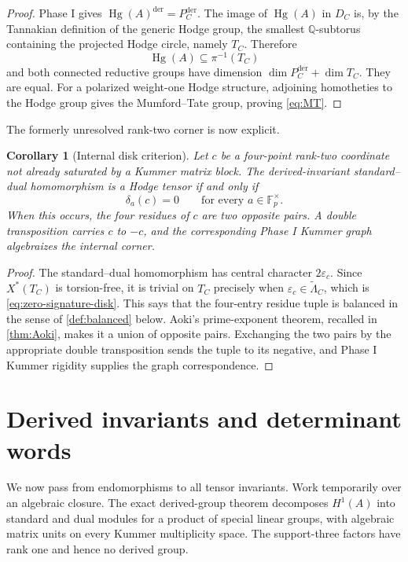 \documentclass[11pt]{article}
\newtheorem{corollary}[theorem]{Corollary}
\theoremstyle{definition}
\theoremstyle{remark}
\newcommand{\Q}{\mathbb Q}
\newcommand{\F}{\mathbb F}
\newcommand{\Hg}{\operatorname{Hg}}
\newcommand{\eps}{\varepsilon}
\newcommand{\der}{\mathrm{der}}
\begin{document}
\begin{proof}
Phase I gives $\Hg(A)^{\der}=P_C^{\der}$.  The image of $\Hg(A)$ in $D_C$ is, by the Tannakian definition of the generic Hodge group, the smallest $\Q$-subtorus containing the projected Hodge circle, namely $T_C$.  Therefore
\[
 \Hg(A)\subseteq\pi^{-1}(T_C)
\]
and both connected reductive groups have dimension
$\dim P_C^{\der}+\dim T_C$.  They are equal.  For a polarized weight-one Hodge structure, adjoining homotheties to the Hodge group gives the Mumford--Tate group, proving \eqref{eq:MT}.
\end{proof}

The formerly unresolved rank-two corner is now explicit.

\begin{corollary}[Internal disk criterion]\label{cor:disk-corner}
Let $c$ be a four-point rank-two coordinate not already saturated by a Kummer matrix block.  The derived-invariant standard--dual homomorphism is a Hodge tensor if and only if
\begin{equation}\label{eq:zero-signature-disk}
 \delta_a(c)=0\qquad\text{for every }a\in\F_p^\times.
\end{equation}
When this occurs, the four residues of $c$ are two opposite pairs.  A double transposition carries $c$ to $-c$, and the corresponding Phase I Kummer graph algebraizes the internal corner.
\end{corollary}

\begin{proof}
The standard--dual homomorphism has central character $2\eps_c$.  Since $X^*(T_C)$ is torsion-free, it is trivial on $T_C$ precisely when $\eps_c\in\widetilde\Lambda_C$, which is \eqref{eq:zero-signature-disk}.  This says that the four-entry residue tuple is balanced in the sense of \cref{def:balanced} below.  Aoki's prime-exponent theorem, recalled in \cref{thm:Aoki}, makes it a union of opposite pairs.  Exchanging the two pairs by the appropriate double transposition sends the tuple to its negative, and Phase I Kummer rigidity supplies the graph correspondence.
\end{proof}

\section{Derived invariants and determinant words}\label{sec:invariants}

We now pass from endomorphisms to all tensor invariants.  Work temporarily over an algebraic closure.  The exact derived-group theorem decomposes $H^1(A)$ into standard and dual modules for a product of special linear groups, with algebraic matrix units on every Kummer multiplicity space.  The support-three factors have rank one and hence no derived group.
\end{document}
